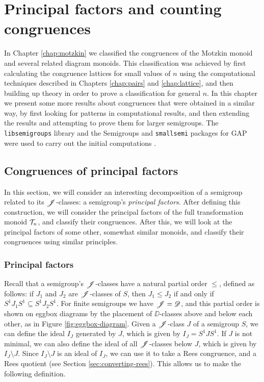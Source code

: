 \chapter{Principal factors and counting congruences}
\label{chap:other}

In Chapter \ref{chap:motzkin} we classified the congruences of the Motzkin
monoid and several related diagram monoids.  This classification was achieved by
first calculating the congruence lattices for small values of $n$ using the
computational techniques described in Chapters \ref{chap:pairs} and
\ref{chap:lattice}, and then building up theory in order to prove a
classification for general $n$.  In this chapter we present some more results
about congruences that were obtained in a similar way, by first looking for
patterns in computational results, and then extending the results and attempting
to prove them for larger semigroups.  The \texttt{libsemigroups} library and the
Semigroups and \texttt{smallsemi} packages for GAP were used to carry out the
initial computations \cite{libsemigroups, semigroups, smallsemi, gap}.

\section{Congruences of principal factors}
\label{sec:princfact}

In this section, we will consider an interesting decomposition of a semigroup
related to its $\mathrel{\mathscr{J}}$-classes: a semigroup's \textit{principal factors}.  After
defining this construction, we will consider the principal factors of the full
transformation monoid $\mathcal{T}_n$, and classify their congruences.  After this, we
will look at the principal factors of some other, somewhat similar monoids, and
classify their congruences using similar principles.

\subsection{Principal factors}
\label{sec:princfact-def}

Recall that a semigroup's $\mathrel{\mathscr{J}}$-classes have a natural partial order $\leq$,
defined as follows: if $J_1$ and $J_2$ are $\mathrel{\mathscr{J}}$-classes of $S$, then
$J_1 \leq J_2$ if and only if $S^1 J_1 S^1 \subseteq S^1 J_2 S^1$.  For finite
semigroups we have $\mathscr{J}=\mathscr{D}$, and this partial order is shown on eggbox diagrams
by the placement of $\DD$-classes above and below each other, as in Figure
\ref{fig:eggbox-diagram}.  Given a $\mathrel{\mathscr{J}}$-class $J$ of a semigroup $S$, we can
define the ideal $I_J$ generated by $J$, which is given by $I_J = S^1 J S^1$.
If $J$ is not minimal, we can also define the ideal of all $\mathrel{\mathscr{J}}$-classes below
$J$, which is given by $I_J \setminus J$.  Since $I_J \setminus J$ is an ideal
of $I_J$, we can use it to take a Rees congruence, and a Rees quotient (see
Section \ref{sec:converting-rees}).  This allows us to make the following
definition. %

